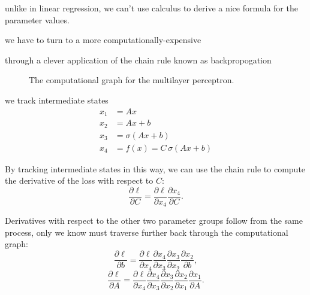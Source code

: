 unlike in linear regression, we can't use calculus to derive a nice formula for the parameter values.

we have to turn to a more computationally-expensive

through a clever application of the chain rule known as backpropogation

\begin{figure}
	\centering
	\caption{The computational graph for the multilayer perceptron.}
\end{figure}

we track intermediate states
\begin{equation}
	\begin{aligned}
		x_1 & = Ax                          \\
		x_2 & = Ax  + b                     \\
		x_3 & = \sigma(Ax  + b)             \\
		x_4 & = f(x) = C \, \sigma(Ax  + b)
	\end{aligned}
\end{equation}

By tracking intermediate states in this way, we can use the chain rule to compute the derivative of the loss with respect to $C$:
\begin{equation*}
	\frac{\partial \ell}{\partial C}
	= \frac{\partial \ell}{\partial x_4}
	\frac{\partial x_4}{\partial C}.
\end{equation*}

Derivatives with respect to the other two parameter groups follow from the same process, only we know must traverse further back through the computational graph:
\begin{equation*}
	\frac{\partial \ell}{\partial b}
	= \frac{\partial \ell}{\partial x_4}
	\frac{\partial x_4}{\partial x_3}
	\frac{\partial x_3}{\partial x_2}
	\frac{\partial x_2}{\partial b},
\end{equation*}
\begin{equation*}
	\frac{\partial \ell}{\partial A}
	= \frac{\partial \ell}{\partial x_4}
	\frac{\partial x_4}{\partial x_3}
	\frac{\partial x_3}{\partial x_2}
	\frac{\partial x_2}{\partial x_1}
	\frac{\partial x_1}{\partial A}.
\end{equation*}

